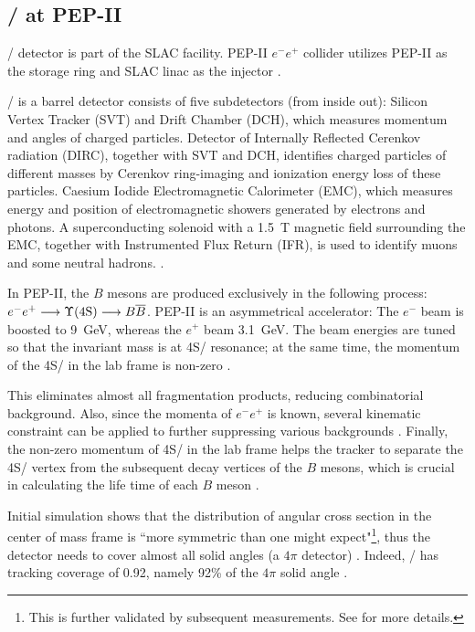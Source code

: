 \subsection{\BaBar/ at PEP-II}
\BaBar/ detector is part of the SLAC facility.
PEP-II $e^- e^+$ collider utilizes PEP-II as the storage ring and SLAC linac as
the injector \cite{Harrison:1998yr}.

\BaBar/ is a barrel detector consists of five subdetectors (from inside out):
Silicon Vertex Tracker (SVT) and Drift Chamber (DCH), which measures momentum
and angles of charged particles.
Detector of Internally
Reflected Cerenkov radiation (DIRC), together with SVT and DCH, identifies
charged particles of different masses by Cerenkov ring-imaging and ionization
energy loss of these particles.
Caesium Iodide Electromagnetic Calorimeter (EMC), which measures energy and
position of electromagnetic showers generated by electrons and photons.
A superconducting solenoid with a \SI{1.5}{T} magnetic field surrounding the
EMC, together with Instrumented Flux Return (IFR), is used to identify muons and
some neutral hadrons. \cite{Lees:2013uzd}.

In PEP-II, the $B$ mesons are produced exclusively in the following process:
$e^- e^+ \longrightarrow \Y4S/ \longrightarrow B \overline{B}$.
PEP-II is an asymmetrical accelerator: The $e^-$ beam is boosted to \SI{9}{GeV},
whereas the $e^+$ beam \SI{3.1}{GeV}.
The beam energies are tuned so that the invariant mass is at \Y4S/ resonance;
at the same time, the momentum of the \Y4S/ in the lab frame is
non-zero \cite{Harrison:1998yr}.

This eliminates almost all fragmentation products, reducing combinatorial
background.
Also, since the momenta of $e^- e^+$ is known, several kinematic constraint
can be applied to further suppressing various
backgrounds \cite{Harrison:1998yr}.
Finally, the non-zero momentum of \Y4S/ in the lab frame helps the tracker to
separate the \Y4S/ vertex from the subsequent decay vertices of the $B$ mesons,
which is crucial in calculating the life time of each $B$
meson \cite{McGregor:2008ek}.

Initial simulation shows that the distribution of angular cross section in the
center of mass frame is ``more symmetric than one might expect"\footnote{
    This is further validated by subsequent measurements.
    See \cite{McGregor:2008ek} for more details.
}, thus the detector needs to cover almost all solid angles
(a $4\pi$ detector) \cite{Boutigny:1995ib}.
Indeed, \BaBar/ has tracking coverage of 0.92, namely 92\% of the $4\pi$ solid
angle \cite{Harrison:1998yr}.

